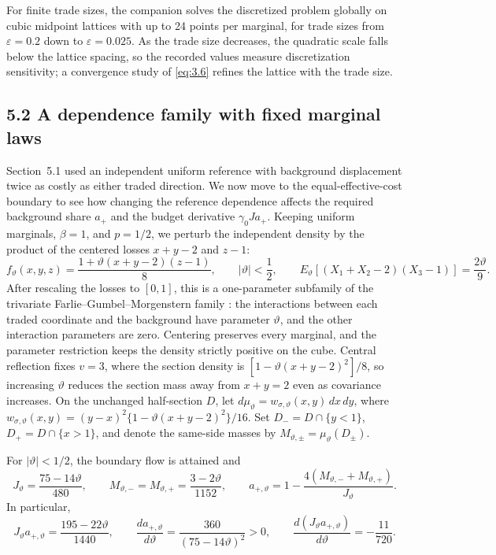 For finite trade sizes, the companion solves the discretized problem
globally on cubic midpoint lattices with up to 24 points per marginal, for
trade sizes from \(\varepsilon=0.2\) down to \(\varepsilon=0.025\). As the
trade size decreases, the quadratic scale falls below the lattice spacing, so
the recorded values measure discretization sensitivity; a convergence study
of \eqref{eq:3.6} refines the lattice with the trade size.

\subsection{5.2 A dependence family with fixed marginal laws}\label{sec:dependence-family}

Section~5.1 used an independent uniform reference with background displacement twice as costly as either traded direction. We now move to the equal-effective-cost boundary to see how changing the reference dependence affects the required background share \(a_+\) and the budget derivative \(\gamma_0Ja_+\). Keeping uniform marginals, \(\beta=1\), and \(p=1/2\), we perturb the independent density by the product of the centered losses \(x+y-2\) and \(z-1\):
\[
f_\vartheta(x,y,z)=\frac{1+\vartheta(x+y-2)(z-1)}8,\qquad
|\vartheta|<\frac12,\qquad
E_\vartheta[(X_1+X_2-2)(X_3-1)]=\frac{2\vartheta}{9}.
\]
After rescaling the losses to \([0,1]\), this is a one-parameter subfamily of the trivariate Farlie--Gumbel--Morgenstern family \cite[Section~2]{otakimura2021}: the interactions between each traded coordinate and the background have parameter \(\vartheta\), and the other interaction parameters are zero. Centering preserves every marginal, and the parameter restriction keeps the density strictly positive on the cube. Central reflection fixes \(v=3\), where the section density is \([1-\vartheta(x+y-2)^2]/8\), so increasing \(\vartheta\) reduces the section mass away from \(x+y=2\) even as covariance increases. On the unchanged half-section \(D\), let \(d\mu_\vartheta=w_{\sigma,\vartheta}(x,y)\,dx\,dy\), where \(w_{\sigma,\vartheta}(x,y)=(y-x)^2\{1-\vartheta(x+y-2)^2\}/16\). Set \(D_-=D\cap\{y<1\}\), \(D_+=D\cap\{x>1\}\), and denote the same-side masses by \(M_{\vartheta,\pm}=\mu_\vartheta(D_\pm)\).

\begin{proposition}\label{prop:dependence-family}
For \(|\vartheta|<1/2\), the boundary flow is attained and
\begin{equation}
J_\vartheta=\frac{75-14\vartheta}{480},\qquad
M_{\vartheta,-}=M_{\vartheta,+}=\frac{3-2\vartheta}{1152},
\qquad
a_{+,\vartheta}
=1-\frac{4(M_{\vartheta,-}+M_{\vartheta,+})}{J_\vartheta}.
\tag{5.3}\label{eq:5.3}
\end{equation}
In particular,
\[
J_\vartheta a_{+,\vartheta}=\frac{195-22\vartheta}{1440},\qquad
\frac{d a_{+,\vartheta}}{d\vartheta}
=\frac{360}{(75-14\vartheta)^2}>0,\qquad
\frac{d(J_\vartheta a_{+,\vartheta})}{d\vartheta}
=-\frac{11}{720}.
\]
\end{proposition}

